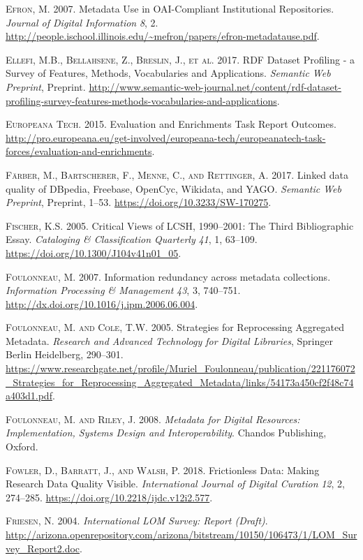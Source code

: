 \textsc{Efron, M.} 2007. Metadata Use in OAI-Compliant Institutional Repositories. \emph{Journal of Digital Information} \emph{8}, 2. \url{http://people.ischool.illinois.edu/~mefron/papers/efron-metadatause.pdf}.

\textsc{Ellefi, M.B., Bellahsene, Z., Breslin, J., et al.} 2017. RDF Dataset Profiling - a Survey of Features, Methods, Vocabularies and Applications. \emph{Semantic Web} \emph{Preprint}, Preprint. \url{http://www.semantic-web-journal.net/content/rdf-dataset-profiling-survey-features-methods-vocabularies-and-applications}.

\textsc{Europeana Tech}. 2015. Evaluation and Enrichments Task Report Outcomes. \url{http://pro.europeana.eu/get-involved/europeana-tech/europeanatech-task-forces/evaluation-and-enrichments}.

\textsc{Färber, M., Bartscherer, F., Menne, C., and Rettinger, A.} 2017. Linked data quality of DBpedia, Freebase, OpenCyc, Wikidata, and YAGO. \emph{Semantic Web} \emph{Preprint}, Preprint, 1–53. \url{https://doi.org/10.3233/SW-170275}.

\textsc{Fischer, K.S.} 2005. Critical Views of LCSH, 1990–2001: The Third Bibliographic Essay. \emph{Cataloging \& Classification Quarterly} \emph{41}, 1, 63–109. \url{https://doi.org/10.1300/J104v41n01_05}.

\textsc{Foulonneau, M.} 2007. Information redundancy across metadata collections. \emph{Information Processing \& Management} \emph{43}, 3, 740–751. \url{http://dx.doi.org/10.1016/j.ipm.2006.06.004}.

\textsc{Foulonneau, M. and Cole, T.W.} 2005. Strategies for Reprocessing Aggregated Metadata. \emph{Research and Advanced Technology for Digital Libraries}, Springer Berlin Heidelberg, 290–301. \url{https://www.researchgate.net/profile/Muriel_Foulonneau/publication/221176072_Strategies_for_Reprocessing_Aggregated_Metadata/links/54173a450cf2f48c74a403d1.pdf}.

\textsc{Foulonneau, M. and Riley, J.} 2008. \emph{Metadata for Digital Resources: Implementation, Systems Design and Interoperability}. Chandos Publishing, Oxford.

\textsc{Fowler, D., Barratt, J., and Walsh, P.} 2018. Frictionless Data: Making Research Data Quality Visible. \emph{International Journal of Digital Curation} \emph{12}, 2, 274–285. \url{https://doi.org/10.2218/ijdc.v12i2.577}.

\textsc{Friesen, N.} 2004. \emph{International LOM Survey: Report (Draft)}. \url{http://arizona.openrepository.com/arizona/bitstream/10150/106473/1/LOM_Survey_Report2.doc}.

